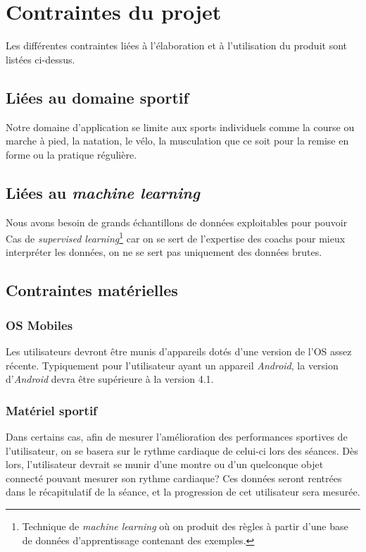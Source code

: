 \chapter{Contraintes du projet}

Les différentes contraintes liées à l'élaboration et à l'utilisation du produit sont listées ci-dessus.

\section{Liées au domaine sportif}

Notre domaine d'application se limite aux sports individuels comme la course ou marche à pied, la natation, le vélo, la musculation que ce soit pour la remise en forme ou la pratique régulière.

\section{Liées au \textit{machine learning}}

Nous avons besoin de grands échantillons de données exploitables pour pouvoir 
Cas de \textit{supervised learning}\footnote{Technique de \textit{machine learning} où on produit des règles à partir d'une base de données d'apprentissage contenant des exemples.} car on se sert de l'expertise des coachs pour mieux interpréter les données, on ne se sert pas uniquement des données brutes.

\section{Contraintes matérielles}

\subsection{OS Mobiles}

Les utilisateurs devront être munis d'appareils dotés d'une version de l'OS assez récente. Typiquement pour l'utilisateur ayant un appareil \textit{Android}, la version d'\textit{Android} devra être supérieure à la version 4.1.

\subsection{Matériel sportif}

Dans certains cas, afin de mesurer l'amélioration des performances sportives de l'utilisateur, on se basera sur le rythme cardiaque de celui-ci lors des séances. Dès lors, l'utilisateur devrait se munir d'une montre ou d'un quelconque objet connecté pouvant mesurer son rythme cardiaque? Ces données seront rentrées dans le récapitulatif de la séance, et la progression de cet utilisateur sera mesurée.

